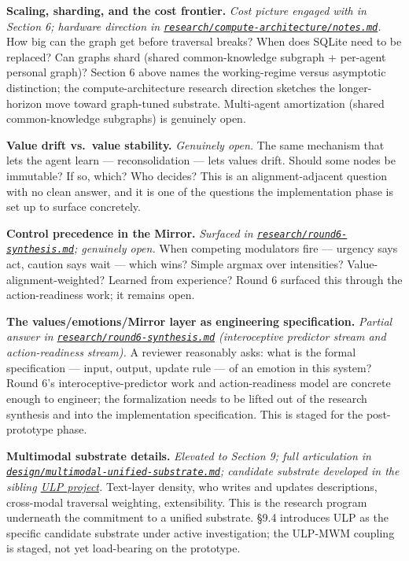 \documentclass[12pt]{article}
\begin{document}
\textbf{Scaling, sharding, and the cost frontier.} \emph{Cost picture engaged with in Section 6; hardware direction in \href{../research/compute-architecture/notes.md}{\texttt{research/compute-architecture/notes.md}}.} How big can the graph get before traversal breaks? When does SQLite need to be replaced? Can graphs shard (shared common-knowledge subgraph + per-agent personal graph)? Section 6 above names the working-regime versus asymptotic distinction; the compute-architecture research direction sketches the longer-horizon move toward graph-tuned substrate. Multi-agent amortization (shared common-knowledge subgraphs) is genuinely open.

\textbf{Value drift vs.~value stability.} \emph{Genuinely open.} The same mechanism that lets the agent learn --- reconsolidation --- lets values drift. Should some nodes be immutable? If so, which? Who decides? This is an alignment-adjacent question with no clean answer, and it is one of the questions the implementation phase is set up to surface concretely.

\textbf{Control precedence in the Mirror.} \emph{Surfaced in \href{../research/round6-synthesis.md}{\texttt{research/round6-synthesis.md}}; genuinely open.} When competing modulators fire --- urgency says act, caution says wait --- which wins? Simple argmax over intensities? Value-alignment-weighted? Learned from experience? Round 6 surfaced this through the action-readiness work; it remains open.

\textbf{The values/emotions/Mirror layer as engineering specification.} \emph{Partial answer in \href{../research/round6-synthesis.md}{\texttt{research/round6-synthesis.md}} (interoceptive predictor stream and action-readiness stream).} A reviewer reasonably asks: what is the formal specification --- input, output, update rule --- of an emotion in this system? Round 6's interoceptive-predictor work and action-readiness model are concrete enough to engineer; the formalization needs to be lifted out of the research synthesis and into the implementation specification. This is staged for the post-prototype phase.

\textbf{Multimodal substrate details.} \emph{Elevated to Section 9; full articulation in \href{../design/multimodal-unified-substrate.md}{\texttt{design/multimodal-unified-substrate.md}}; candidate substrate developed in the sibling \href{../../ULP/}{ULP project}.} Text-layer density, who writes and updates descriptions, cross-modal traversal weighting, extensibility. This is the research program underneath the commitment to a unified substrate. §9.4 introduces ULP as the specific candidate substrate under active investigation; the ULP-MWM coupling is staged, not yet load-bearing on the prototype.
\end{document}
